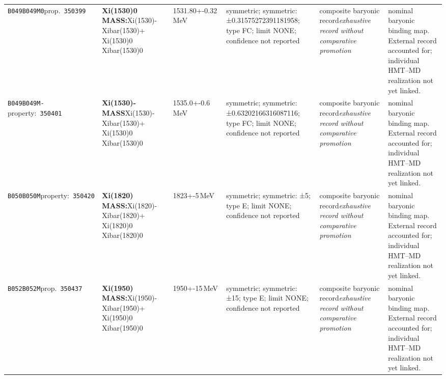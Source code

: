 \begin{landscape}
\begin{longtable}{L{1.85cm}L{4.45cm}L{2.35cm}L{4.05cm}L{3.35cm}L{7.15cm}}
\texttt{B049}\newline \texttt{B049M0}\newline prop.\ \texttt{350399} & \textbf{Xi(1530)0 MASS:}\newline Xi(1530)- \textbar{}\allowbreak{} Xibar(1530)+ \textbar{}\allowbreak{} Xi(1530)0 \textbar{}\allowbreak{} Xibar(1530)0 & 1531.80+-0.32\,MeV & symmetric; symmetric: ±0.31575272391181958; type FC; limit NONE; confidence not reported & composite baryonic record\newline \emph{exhaustive record without comparative promotion} & nominal baryonic binding map. External record accounted for; individual HMT--MD realization not yet linked. \\
\texttt{B049}\newline \texttt{B049M-}\newline property:\ \texttt{350401} & \textbf{Xi(1530)- MASS}\newline Xi(1530)- \textbar{}\allowbreak{} Xibar(1530)+ \textbar{}\allowbreak{} Xi(1530)0 \textbar{}\allowbreak{} Xibar(1530)0 & 1535.0+-0.6\,MeV & symmetric; symmetric: ±0.63202166316087116; type FC; limit NONE; confidence not reported & composite baryonic record\newline \emph{exhaustive record without comparative promotion} & nominal baryonic binding map. External record accounted for; individual HMT--MD realization not yet linked. \\
\texttt{B050}\newline \texttt{B050M}\newline property:\ \texttt{350420} & \textbf{Xi(1820) MASS:}\newline Xi(1820)- \textbar{}\allowbreak{} Xibar(1820)+ \textbar{}\allowbreak{} Xi(1820)0 \textbar{}\allowbreak{} Xibar(1820)0 & 1823+-5\,MeV & symmetric; symmetric: ±5; type E; limit NONE; confidence not reported & composite baryonic record\newline \emph{exhaustive record without comparative promotion} & nominal baryonic binding map. External record accounted for; individual HMT--MD realization not yet linked. \\
\texttt{B052}\newline \texttt{B052M}\newline prop.\ \texttt{350437} & \textbf{Xi(1950) MASS:}\newline Xi(1950)- \textbar{}\allowbreak{} Xibar(1950)+ \textbar{}\allowbreak{} Xi(1950)0 \textbar{}\allowbreak{} Xibar(1950)0 & 1950+-15\,MeV & symmetric; symmetric: ±15; type E; limit NONE; confidence not reported & composite baryonic record\newline \emph{exhaustive record without comparative promotion} & nominal baryonic binding map. External record accounted for; individual HMT--MD realization not yet linked. \\

\end{longtable}
\end{landscape}
